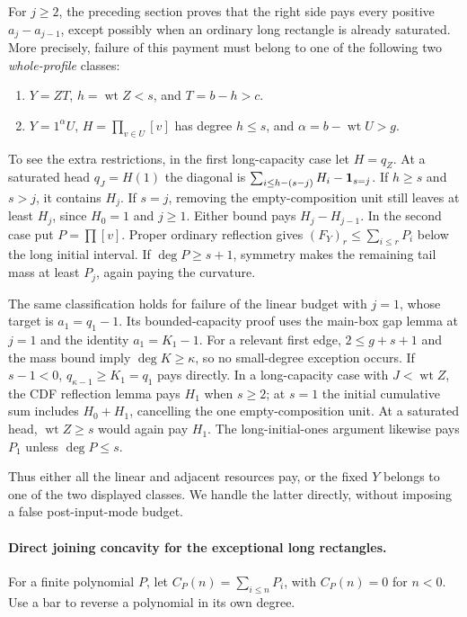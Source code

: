 For $j\ge2$, the preceding section proves that the right side
pays every positive $a_j-a_{j-1}$, except possibly when an
ordinary long rectangle is already saturated. More precisely,
failure of this payment must belong to one of the following
two \emph{whole-profile} classes:
\begin{enumerate}
\item $Y=Z T$, $h=\operatorname{wt}Z<s$, and $T=b-h>c$.
\item $Y=1^\alpha U$, $H=\prod_{v\in U}[v]$ has
      degree $h\le s$, and $\alpha=b-\operatorname{wt}U>g$.
\end{enumerate}
To see the extra restrictions, in the first long-capacity case
let $H=q_Z$. At a saturated head $q_J=H(1)$ the diagonal is
$\sum_{i\le h-(s-j)}H_i-{\bf1}_{s=j}$.
If $h\ge s$ and $s>j$, it contains $H_j$.
If $s=j$, removing the empty-composition unit still leaves
at least $H_j$, since $H_0=1$ and $j\ge1$.
Either bound pays $H_j-H_{j-1}$. In the second case put
$P=\prod[v]$. Proper ordinary reflection gives
$(F_Y)_r\le\sum_{i\le r}P_i$ below the long initial interval.
If $\deg P\ge s+1$, symmetry makes the remaining tail
mass at least $P_j$, again paying the curvature.

The same classification holds for failure of the linear
budget with $j=1$, whose target is $a_1=q_1-1$.
Its bounded-capacity proof uses the main-box gap lemma at
$j=1$ and the identity $a_1=K_1-1$.
For a relevant first edge, $2\le g+s+1$ and the mass bound
imply $\deg K\ge\kappa$, so no small-degree exception occurs.
If $s-1<0$, $q_{\kappa-1}\ge K_1=q_1$ pays directly.
In a long-capacity case with $J<\operatorname{wt}Z$, the
CDF reflection lemma pays $H_1$ when $s\ge2$; at $s=1$
the initial cumulative sum includes $H_0+H_1$, cancelling
the one empty-composition unit. At a saturated head,
$\operatorname{wt}Z\ge s$ would again pay $H_1$.
The long-initial-ones argument likewise pays $P_1$ unless
$\deg P\le s$.

Thus either all the linear and adjacent resources pay, or
the fixed $Y$ belongs to one of the two displayed classes.
We handle the latter directly, without imposing a false
post-input-mode budget.

\paragraph{Direct joining concavity for the exceptional long rectangles.}
For a finite polynomial $P$, let
$C_P(n)=\sum_{i\le n}P_i$, with $C_P(n)=0$ for $n<0$.
Use a bar to reverse a polynomial in its own degree.

